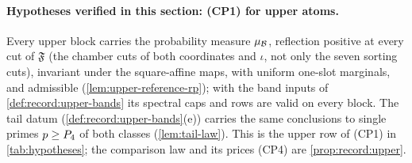 \paragraph{Hypotheses verified in this section: (CP1) for upper atoms.}
Every upper block carries the probability measure $\mu_\mathcal B$, reflection positive at
every cut of $\mathfrak F$ (the chamber cuts of both coordinates and $\iota$, not only the
seven sorting cuts), invariant under the square-affine maps, with uniform one-slot
marginals, and admissible (\cref{lem:upper-reference-rp}); with the band inputs of
\cref{def:record:upper-bands} its spectral caps and rows are valid on every block. The
tail datum (\cref{def:record:upper-bands}(e)) carries the same conclusions to single
primes $p\ge P_4$ of both classes (\cref{lem:tail-law}). This is the upper row of
(CP1) in \cref{tab:hypotheses}; the comparison law and its prices (CP4) are
\cref{prop:record:upper}.
